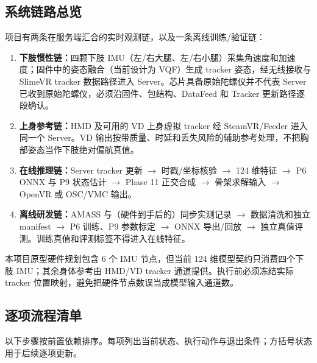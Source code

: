 \documentclass[UTF8,11pt,a4paper]{ctexart}
\begin{document}
\subsection{系统链路总览}
项目有两条在服务端汇合的实时观测链，以及一条离线训练/验证链：
\begin{enumerate}
  \item \textbf{下肢惯性链：}四颗下肢 IMU（左/右大腿、左/右小腿）采集角速度和加速度；固件中的姿态融合（当前设计为 VQF）生成 tracker 姿态，经无线接收与 SlimeVR tracker 数据路径进入 Server。芯片具备原始陀螺仪并不代表 Server 已收到原始陀螺仪，必须沿固件、包结构、DataFeed 和 Tracker 更新路径逐段确认。
  \item \textbf{上身参考链：}HMD 及可用的 VD 上身虚拟 tracker 经 SteamVR/Feeder 进入同一个 Server。VD 输出按带质量、时延和丢失风险的辅助参考处理，不把胸部姿态当作下肢绝对偏航真值。
  \item \textbf{在线推理链：}Server tracker 更新 \(\to\) 时戳/坐标核验 \(\to\) 124 维特征 \(\to\) P6 ONNX 与 P9 状态估计 \(\to\) Phase 11 正交合成 \(\to\) 骨架求解输入 \(\to\) OpenVR 或 OSC/VMC 输出。
  \item \textbf{离线研发链：}AMASS 与（硬件到手后的）同步实测记录 \(\to\) 数据清洗和独立 manifest \(\to\) P6 训练、P9 参数标定 \(\to\) ONNX 导出/回放 \(\to\) 独立真值评测。训练真值和评测标签不得进入在线特征。
\end{enumerate}

本项目原型硬件规划包含 6 个 IMU 节点，但当前 124 维模型契约只消费四个下肢 IMU；其余身体参考由 HMD/VD tracker 通道提供。执行前必须冻结实际 tracker 位置映射，避免把硬件节点数误当成模型输入通道数。

\subsection{逐项流程清单}
以下步骤按前置依赖排序。每项列出当前状态、执行动作与退出条件；方括号状态用于后续逐项更新。
\end{document}
